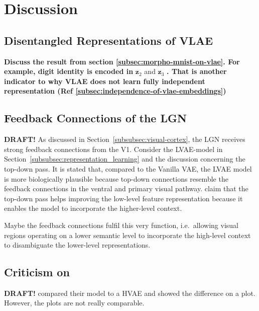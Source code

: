\documentclass[11pt]{article}
\begin{document}
    \section{Discussion}\label{sec:discussion}

    \subsection{Disentangled Representations of VLAE}
    \textbf{Discuss the result from section \ref{subsec:morpho-mnist-on-vlae}. For example, digit identity is encoded in} $\bm{z}_2$ and $\bm{z}_3$ \textbf{. That is another indicator to why VLAE does not learn fully independent representation (Ref \ref{subsec:independence-of-vlae-embeddings})}

\subsection{Feedback Connections of the \acl{LGN}}\label{subsec:feedback-connections-of-the-lateral-geniculate-nucleus}
\textbf{DRAFT!}
As discussed in Section~\ref{subsubsec:visual-cortex}, the \ac{LGN} receives strong feedback connections from the \ac{V1}.
Consider the \ac{LVAE}-model in Section~\ref{subsubsec:representation_learning} and the discussion concerning the top-down pass.
It is stated that, compared to the Vanilla VAE, the \ac{LVAE} model is more biologically plausible because top-down connections resemble the feedback connections in the ventral and primary visual pathway.
\citet{sonderby2016ladder} claim that the top-down pass helps improving the low-level feature representation because it enables the model to incorporate the higher-level context.

Maybe the feedback connections fulfil this very function, i.e.\ allowing visual regions operating on a lower semantic level to incorporate the high-level context to disambiguate the lower-level representations.

\subsection{Criticism on \citet{zhao2017learning}}\label{subseq:criticism_vlae}
\textbf{DRAFT!}
\citet{zhao2017learning} compared their model to a HVAE and showed the difference on a plot.
However, the plots are not really comparable.
\end{document}
